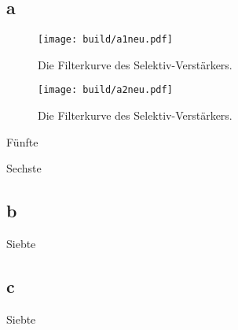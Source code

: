 \subsection{a}
\begin{figure}
	\centering
	\caption{Die Filterkurve des Selektiv-Verstärkers.}
	\texttt{[image: build/a1neu.pdf]}
	\label{fig:GraphSelektiv}
\end{figure}
\begin{figure}
	\centering
	\caption{Die Filterkurve des Selektiv-Verstärkers.}
	\texttt{[image: build/a2neu.pdf]}
	\label{fig:GraphSelektiv}
\end{figure}
\begin{table}
	\caption{Fünfte}
	\centering
	
\end{table}
\begin{table}
	\caption{Sechste}
	\centering
	
\end{table}

\subsection{b}
\begin{table}
	\caption{Siebte}
	\centering
	
\end{table}


\subsection{c}
\begin{table}
	\caption{Siebte}
	\centering
	
\end{table}

